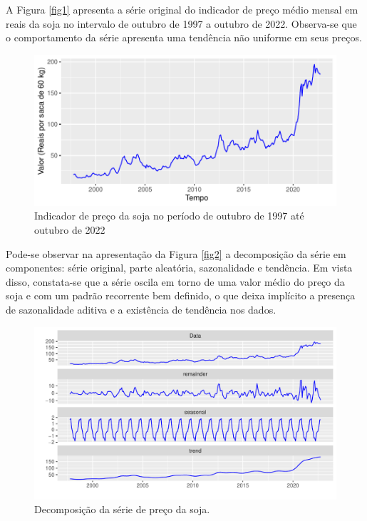 \documentclass[
	12pt,				%
	openright,			%
	oneside,      %
	a4paper,			%
	english,			%
	french,				%
	spanish,			%
	brazil,				%
	]{abntex2}\usepackage[]{graphicx}\usepackage[table]{xcolor}
\makeatletter
\def\maxwidth{ %
  \ifdim\Gin@nat@width>\linewidth
    \linewidth
  \else
    \Gin@nat@width
  \fi
}
\newenvironment{knitrout}{}{} %
\theoremstyle{definition}
\theoremstyle{remark}
\makeatother
\begin{document}
A Figura \ref{fig1} apresenta a série original do indicador de preço médio mensal em reais da soja no intervalo de outubro de 1997 a outubro de 2022. Observa-se que o comportamento da série apresenta uma tendência não uniforme em seus preços.

\begin{knitrout}
\color{fgcolor}\begin{figure}[H]
\includegraphics[width=\maxwidth]{figure/script1-1} \caption[Indicador de preço da soja no período de outubro de 1997 até outubro de 2022 \label{fig1}]{Indicador de preço da soja no período de outubro de 1997 até outubro de 2022 \label{fig1}}\label{fig:script1}
\end{figure}

\end{knitrout}

Pode-se observar na apresentação da Figura \ref{fig2} a decomposição da série em componentes: série original, parte aleatória, sazonalidade e tendência. Em vista disso, constata-se que a série oscila em torno de uma valor médio do preço da soja e com um padrão recorrente bem definido, o que deixa implícito a presença de sazonalidade aditiva e a existência de tendência nos dados.


\begin{knitrout}
\color{fgcolor}\begin{figure}
\includegraphics[width=\maxwidth]{figure/script2-1} \caption[Decomposição da série de preço da soja]{Decomposição da série de preço da soja.\label{fig2}}\label{fig:script2}
\end{figure}

\end{knitrout}
\end{document}
